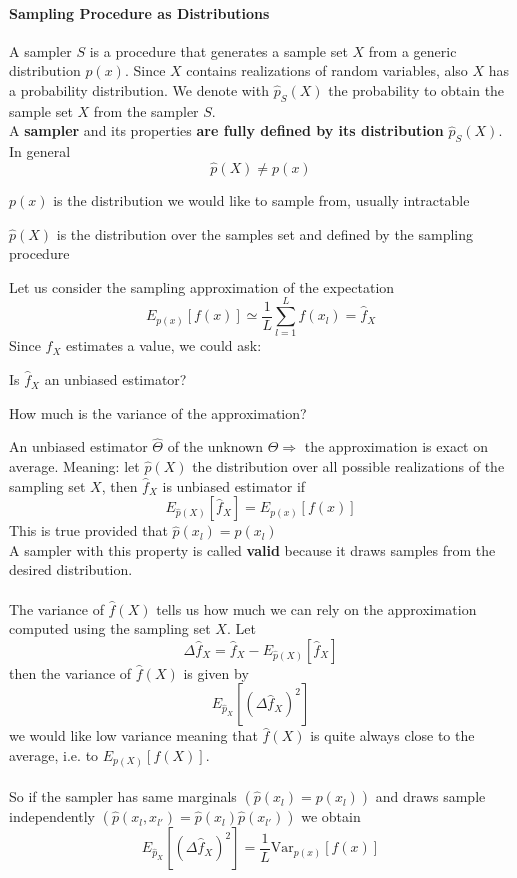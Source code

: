 \documentclass[10pt]{report}
\begin{document}
\paragraph{Sampling Procedure as Distributions} A sampler $S$ is a procedure that generates a sample set $X$ from a generic distribution $p(x)$. Since $X$ contains realizations of random variables, also $X$ has a probability distribution. We denote with $\hat{p}_S(X)$ the probability to obtain the sample set $X$ from the sampler $S$.\\
A \textbf{sampler} and its properties \textbf{are fully defined by its distribution} $\hat{p}_S(X)$. In general
$$\hat{p}(X) \neq p(x)$$
\begin{list}{}{}
	\item $p(x)$ is the distribution we would like to sample from, usually intractable
	\item $\hat{p}(X)$ is the distribution over the samples set and defined by the sampling procedure
\end{list}
Let us consider the sampling approximation of the expectation
$$E_{p(x)}[f(x)]\simeq \frac{1}{L}\sum_{l=1}^L f(x_l) = \hat{f}_X$$
Since $\hat{f}_X$ estimates a value, we could ask:
\begin{list}{}{}
	\item Is $\hat{f}_X$ an unbiased estimator?
	\item How much is the variance of the approximation?
\end{list}
An unbiased estimator $\hat{\Theta}$ of the unknown $\Theta \Rightarrow$ the approximation is exact on average. Meaning: let $\hat{p}(X)$ the distribution over all possible realizations of the sampling set $X$, then $\hat{f}_X$ is unbiased estimator if $$E_{\hat{p}(X)}[\hat{f}_X] = E_{p(x)}[f(x)]$$
This is true provided that $\hat{p}(x_l) = p(x_l)$\\
A sampler with this property is called \textbf{valid} because it draws samples from the desired distribution.\\\\
The variance of $\hat{f}(X)$ tells us how much we can rely on the approximation computed using the sampling set $X$. Let $$\Delta\hat{f}_X = \hat{f}_X - E_{\hat{p}(X)}[\hat{f}_X]$$ then the variance of $\hat{f}(X)$ is given by $$E_{\hat{p}_X}[(\Delta\hat{f}_X)^2]$$
we would like low variance meaning that $\hat{f}(X)$ is quite always close to the average, i.e. to $E_{p(X)}[f(X)]$.\\\\
So if the sampler has same marginals $(\hat{p}(x_l)=p(x_l))$ and draws sample independently $(\hat{p}(x_l,x_{l'}) = \hat{p}(x_l)\hat{p}(x_{l'}))$ we obtain $$E_{\hat{p}_X}[(\Delta \hat{f}_X)^2] = \frac{1}{L}\text{Var}_{p(x)}[f(x)]$$
\end{document}
